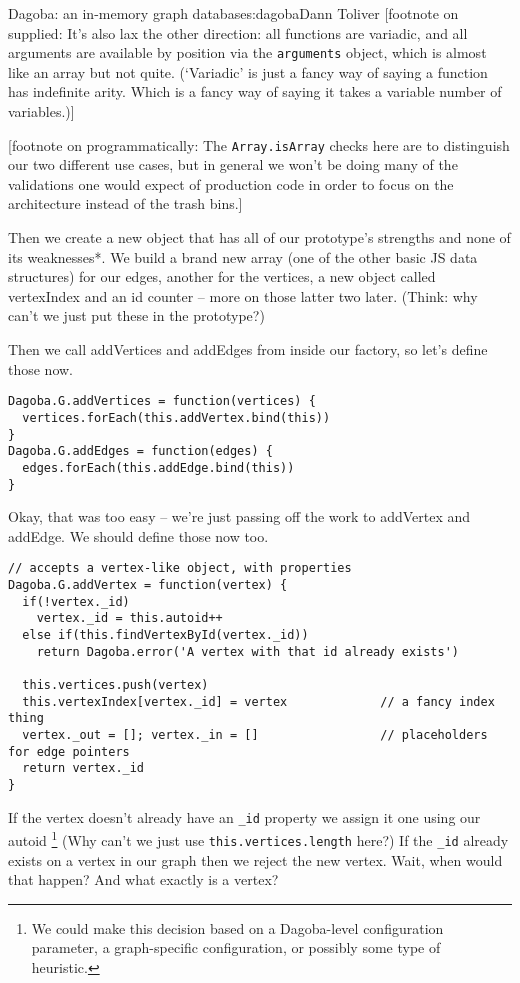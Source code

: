 \begin{aosachapter}{Dagoba: an in-memory graph database}{s:dagoba}{Dann Toliver}
{[}footnote on supplied: It's also lax the other direction: all
functions are variadic, and all arguments are available by position via
the \texttt{arguments} object, which is almost like an array but not
quite. (`Variadic' is just a fancy way of saying a function has
indefinite arity. Which is a fancy way of saying it takes a variable
number of variables.){]}

{[}footnote on programmatically: The \texttt{Array.isArray} checks here
are to distinguish our two different use cases, but in general we won't
be doing many of the validations one would expect of production code in
order to focus on the architecture instead of the trash bins.{]}

Then we create a new object that has all of our prototype's strengths
and none of its weaknesses*. We build a brand new array (one of the
other basic JS data structures) for our edges, another for the vertices,
a new object called vertexIndex and an id counter -- more on those
latter two later. (Think: why can't we just put these in the prototype?)

Then we call addVertices and addEdges from inside our factory, so let's
define those now.

\begin{verbatim}
Dagoba.G.addVertices = function(vertices) { 
  vertices.forEach(this.addVertex.bind(this)) 
}
Dagoba.G.addEdges = function(edges) { 
  edges.forEach(this.addEdge.bind(this)) 
}
\end{verbatim}

Okay, that was too easy -- we're just passing off the work to addVertex
and addEdge. We should define those now too.

\begin{verbatim}
// accepts a vertex-like object, with properties
Dagoba.G.addVertex = function(vertex) {                 
  if(!vertex._id)
    vertex._id = this.autoid++
  else if(this.findVertexById(vertex._id))
    return Dagoba.error('A vertex with that id already exists')
    
  this.vertices.push(vertex)
  this.vertexIndex[vertex._id] = vertex             // a fancy index thing
  vertex._out = []; vertex._in = []                 // placeholders for edge pointers
  return vertex._id
}
\end{verbatim}

If the vertex doesn't already have an \texttt{\_id} property we assign
it one using our autoid \footnote{We could make this decision based on a
  Dagoba-level configuration parameter, a graph-specific configuration,
  or possibly some type of heuristic.} (Why can't we just use
\texttt{this.vertices.length} here?) If the \texttt{\_id} already exists
on a vertex in our graph then we reject the new vertex. Wait, when would
that happen? And what exactly is a vertex?


\end{aosachapter}
